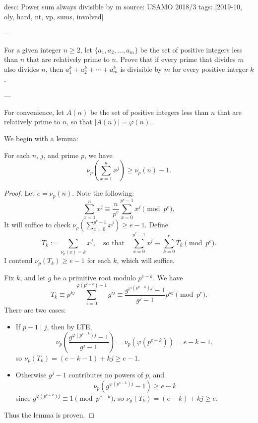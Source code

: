 desc: Power sum always divisible by m
source: USAMO 2018/3
tags: [2019-10, oly, hard, nt, vp, sums, involved]

---

For a given integer $n\ge2$, let $\{a_1,a_2,\ldots,a_m\}$ be the set of positive integers less than $n$ that are relatively prime to $n$. Prove that if every prime that divides $m$ also divides $n$, then $a_1^k+a_2^k+\cdots+a_m^k$ is divisible by $m$ for every positive integer $k$.

---

For convenience, let $A(n)$ be the set of positive integers less than $n$ that are relatively prime to $n$, so that $|A(n)|=\varphi(n)$.

We begin with a lemma:
\begin{lemma*}
    For each $n$, $j$, and prime $p$, we have \[\nu_p\left(\sum_{x=1}^nx^j\right)\ge\nu_p(n)-1.\]
\end{lemma*}
\begin{proof}
    Let $e=\nu_p(n)$. Note the following: \[\sum_{x=1}^nx^j\equiv\frac n{p^e}\sum_{x=0}^{p^e-1}x^j\pmod{p^e},\]
    It will suffice to check $\nu_p\left(\sum_{x=0}^{p^e-1}x^j\right)\ge e-1$. Define \[T_k:=\sum_{\nu_p(x)=k}x^j,\quad\text{so that}\quad\sum_{x=0}^{p^e-1}x^j\equiv\sum_{k=0}^eT_k\pmod{p^e}.\]
    I contend $\nu_p(T_k)\ge e-1$ for each $k$, which will suffice.

    Fix $k$, and let $g$ be a primitive root modulo $p^{e-k}$. We have \[T_k\equiv p^{kj}\sum_{i=0}^{\varphi(p^{e-k})-1}g^{ij}\equiv\frac{g^{\varphi(p^{e-k})j}-1}{g^j-1}p^{kj}\pmod{p^e}.\]
    There are two cases:
    \begin{itemize}
        \item If $p-1\mid j$, then by LTE, \[\nu_p\left(\frac{g^{\varphi(p^{e-k})j}-1}{g^j-1}\right)=\nu_p\left(\varphi\left(p^{e-k}\right)\right)=e-k-1,\]
            so $\nu_p(T_k)=(e-k-1)+kj\ge e-1$.
        \item Otherwise $g^j-1$ contributes no powers of $p$, and \[\nu_p\left(g^{\varphi(p^{e-k})j}-1\right)\ge e-k\]
            since $g^{\varphi(p^{e-k})j}\equiv1\pmod{p^{e-k}}$, so $\nu_p(T_k)=(e-k)+kj\ge e$.
    \end{itemize}
    Thus the lemma is proven.
\end{proof}

